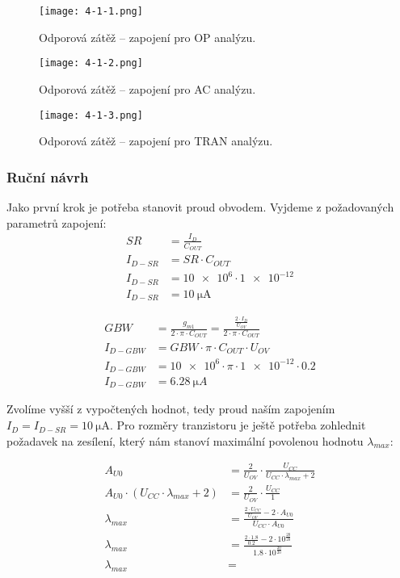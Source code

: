 \begin{figure}[h!]
  \centering
  \texttt{[image: 4-1-1.png]}
  \caption{Odporová zátěž -- zapojení pro OP analýzu.}
  \label{fig:spice0-png}
\end{figure}
\begin{figure}[h!]
    \centering
    \texttt{[image: 4-1-2.png]}
    \caption{Odporová zátěž -- zapojení pro AC analýzu.}
    \label{fig:spice0-png}
  \end{figure}
  \begin{figure}[h!]
    \centering
    \texttt{[image: 4-1-3.png]}
    \caption{Odporová zátěž -- zapojení pro TRAN analýzu.}
    \label{fig:spice0-png}
  \end{figure}


\subsubsection{Ruční návrh}
    Jako první krok je potřeba stanovit proud obvodem. Vyjdeme z požadovaných parametrů zapojení:
    \begin{align*}
        SR & =\frac{I_D}{C_{OUT}} \\
        I_{D-SR}  & =SR\cdot C_{OUT} \\
        I_{D-SR}  & =\num{10e6}\cdot \num{1e-12} \\
        I_{D-SR}  & =\qty{10}{\micro\ampere} 
    \end{align*}
    
    \begin{align*}
        GBW & =\frac{g_{m 1}}{2 \cdot \pi \cdot C_{O U T}}=\frac{\frac{2 \cdot I_D}{U_{O V}}}{2 \cdot \pi \cdot C_{O U T}} \\
        I_{D-GBW}  & =GBW\cdot \pi \cdot C_{OUT} \cdot U_{OV} \\
        I_{D-GBW}  & =\num{10e6}\cdot \pi \cdot \num{1e-12} \cdot \num{0.2} \\
        I_{D-GBW}  & =\qty{6.28}{\micro A}
    \end{align*}


    Zvolíme vyšší z vypočtených hodnot, tedy proud naším zapojením \(I_{D} = I_{D-SR} = \qty{10}{\micro\ampere} \). Pro rozměry tranzistoru je ještě potřeba zohlednit požadavek na zesílení, který nám stanoví maximální povolenou hodnotu \(\lambda_{max}  \):
    
    \begin{align*}
        A_{U 0} & =\frac{2}{U_{O V}} \cdot \frac{U_{C C}}{U_{C C} \cdot \lambda_{max} +2} \\
        A_{U 0} \cdot (U_{C C} \cdot \lambda_{max} +2) & =\frac{2}{U_{O V}} \cdot \frac{U_{C C}}{1} \\
        \lambda_{max} & =\frac{\frac{2\cdot U_{C C}}{U_{O V}} -2\cdot A_{U0}}{U_{CC}\cdot A_{U0}  } \\
        \lambda_{max} & =\frac{\frac{2\cdot \num{1.8}}{\num{0.2}} -2\cdot 10^{\frac{20}{20}}}{\num{1.8}\cdot 10^{\frac{20}{20}}} \\
        \lambda_{max} & =\qty{}{}
    \end{align*}
    


